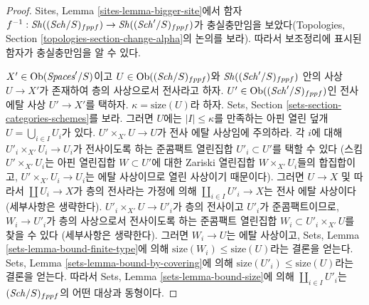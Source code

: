 \begin{proof}
Sites, Lemma \ref{sites-lemma-bigger-site}에서 함자
$f^{-1} : \mathop{\mathit{Sh}}\nolimits((\mathit{Sch}/S)_{fppf}) \to \mathop{\mathit{Sh}}\nolimits((\mathit{Sch}'/S)_{fppf})$가
충실충만임을 보았다(Topologies, Section
\ref{topologies-section-change-alpha}의 논의를 보라).
따라서 보조정리에 표시된 함자가 충실충만임을 알 수 있다.

\medskip\noindent
$X' \in \mathop{\mathrm{Ob}}\nolimits(\textit{Spaces}'/S)$이고
$U \in \mathop{\mathrm{Ob}}\nolimits((\mathit{Sch}/S)_{fppf})$와 $\mathop{\mathit{Sh}}\nolimits((\mathit{Sch}'/S)_{fppf})$ 안의
사상 $U \to X'$가 존재하여 층의 사상으로서 전사라고 하자.
$U' \in \mathop{\mathrm{Ob}}\nolimits((\mathit{Sch}'/S)_{fppf})$인 전사 에탈 사상
$U' \to X'$를 택하자. $\kappa = \text{size}(U)$라 하자.
Sets, Section \ref{sets-section-categories-schemes}를 보라.
그러면 $U$에는 $|I| \leq \kappa$를 만족하는 아핀 열린 덮개
$U = \bigcup_{i \in I} U_i$가 있다.
$U' \times_{X'} U \to U$가 전사 에탈 사상임에 주의하라.
각 $i$에 대해 $U'_i \times_{X'} U_i \to U_i$가 전사이도록 하는
준콤팩트 열린집합 $U'_i \subset U'$를 택할 수 있다
(스킴 $U' \times_{X'} U_i$는 아핀 열린집합 $W \subset U'$에 대한
Zariski 열린집합 $W \times_{X'} U_i$들의 합집합이고,
$U' \times_{X'} U_i \to U_i$는 에탈 사상이므로 열린 사상이기
때문이다).
그러면 $U \to X$ 및 따라서 $\coprod U_i \to X$가 층의 전사라는
가정에 의해 $\coprod_{i \in I} U'_i \to X$는 전사 에탈 사상이다
(세부사항은 생략한다).
$U'_i \times_{X'} U \to U'_i$가 층의 전사이고 $U'_i$가
준콤팩트이므로, $W_i \to U'_i$가 층의 사상으로서 전사이도록 하는
준콤팩트 열린집합 $W_i \subset U'_i \times_{X'} U$를 찾을 수 있다
(세부사항은 생략한다). 그러면 $W_i \to U$는 에탈 사상이고,
Sets, Lemma \ref{sets-lemma-bound-finite-type}에 의해
$\text{size}(W_i) \leq \text{size}(U)$라는 결론을 얻는다.
Sets, Lemma \ref{sets-lemma-bound-by-covering}에 의해
$\text{size}(U'_i) \leq \text{size}(U)$라는 결론을 얻는다.
따라서 Sets, Lemma \ref{sets-lemma-bound-size}에 의해
$\coprod_{i \in I} U'_i$는 $(\mathit{Sch}/S)_{fppf}$의 어떤 대상과
동형이다.


\end{proof}
